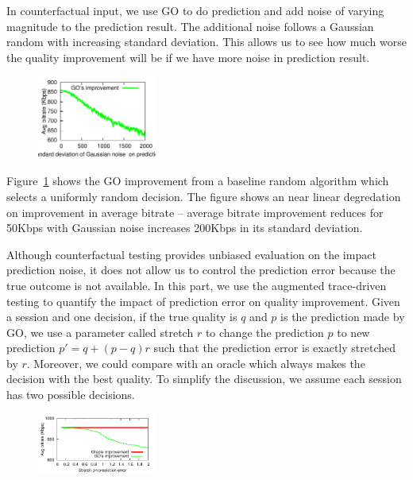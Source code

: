 In counterfactual input, we use GO to do prediction and add noise of varying magnitude to the prediction result. The additional noise follows a Gaussian random with increasing standard deviation.
This allows us to see how much worse the quality improvement will be if we have more noise in prediction result. 

\begin{figure}[h!]
\centering
 \includegraphics[width=0.35\textwidth] {figures/newfig/trendNoise-metricId1-keyGlobal-partition.pdf}
\label{fig:trace-accuracy-1}
\end{figure}

Figure~\ref{fig:trace-accuracy-1} shows the GO improvement from a baseline random algorithm which selects a uniformly random decision. The figure shows an near linear degredation on improvement in average bitrate -- average bitrate improvement reduces for 50Kbps with Gaussian noise increases 200Kbps in its standard deviation.



Although counterfactual testing provides unbiased evaluation on the impact prediction noise, it does not allow us to control the prediction error because the true outcome is not available. In this part, we use the augmented trace-driven testing to quantify the impact of prediction error on quality improvement. Given a session and one decision, if the true quality is $q$ and $p$ is the prediction made by GO, we use a parameter called stretch $r$ to change the prediction $p$ to new prediction $p'=q+(p-q)r$ such that the prediction error is exactly stretched by $r$. 
Moreover, we could compare with an oracle which always makes the decision with the best quality. To simplify the discussion, we assume each session has two  possible decisions. 

\begin{figure}[h!]
\centering
 \includegraphics[width=0.35\textwidth] {figures/newfig/trendAccuracy-metricId1-keyGlobal-partition.pdf}
\label{fig:trace-accuracy-2}
\end{figure}

